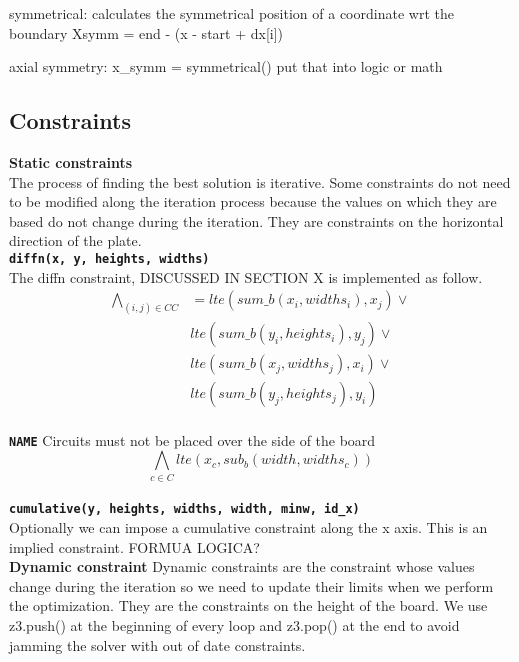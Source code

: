 symmetrical: calculates the symmetrical position of a coordinate wrt the boundary
Xsymm = end - (x - start + dx[i])

axial symmetry:
x\_symm = symmetrical()
put that into logic or math





\subsection{Constraints}

\textbf{Static constraints}\\
The process of finding the best solution is iterative. Some constraints do not 
need to be modified along the iteration process because the values on which they 
are based do not change during the iteration. They are constraints on the horizontal 
direction of the plate.\\

\texttt\textbf{diffn(x, y, heights, widths)}\\
The diffn constraint, DISCUSSED IN SECTION X is implemented as follow.
\begin{equation}
    \begin{split}
        \bigwedge\limits_{(i, j) \in CC}&=
        lte(sum\_b(x_i, widths_i), x_j) \vee \\
        &lte(sum\_b(y_i, heights_i), y_j) \vee \\
        &lte(sum\_b(x_j, widths_j), x_i) \vee \\
        &lte(sum\_b(y_j, heights_j), y_i)
    \end{split}
\end{equation}\\

\texttt\textbf{NAME} Circuits must not be placed over the side of the board\\
\begin{equation}
    \bigwedge\limits_{c \in C} lte(x_c, sub_b(width, widths_c))
\end{equation}\\

\texttt\textbf{cumulative(y, heights, widths, width, minw, id\_x) }\\ 
Optionally we can impose a cumulative constraint along the x axis. This is an implied
 constraint. FORMUA LOGICA?\\

\textbf{Dynamic constraint}
Dynamic constraints are the constraint whose values change during the iteration so we
need to update their limits when we perform the optimization. They are the constraints 
on the height of the board. We use z3.push() at the beginning of every loop and z3.pop()
 at the end to avoid jamming the solver with out of date constraints.\\

